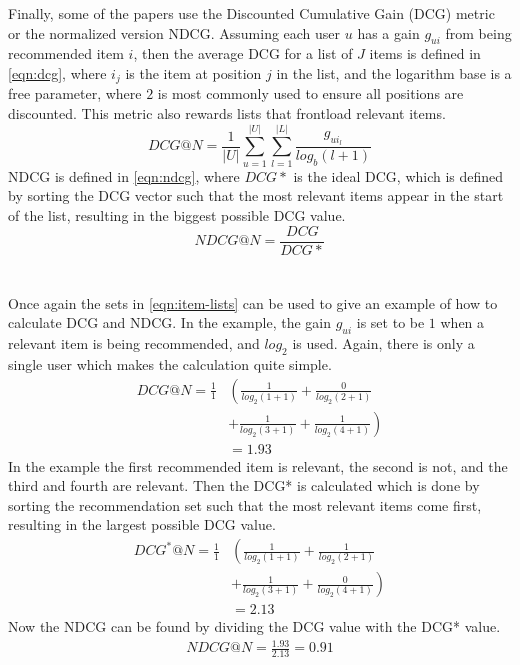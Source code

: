 Finally, some of the papers use the Discounted Cumulative Gain (DCG) metric or the normalized version NDCG.
Assuming each user $u$ has a gain $g_{ui}$ from being recommended item $i$, then the average DCG for a list of $J$ items is defined in \cref{eqn:dcg}, where $i_j$ is the item at position $j$ in the list, and the logarithm base is a free parameter, where $2$ is most commonly used to ensure all positions are discounted.
This metric also rewards lists that frontload relevant items.
\begin{equation}
    \label{eqn:dcg}
    DCG@N = \frac{1}{|U|} \sum\limits_{u=1}^{|U|} \sum\limits_{l = 1}^{|L|} \frac{g_{ui_l}}{log_b (l+1)}
\end{equation}
NDCG is defined in \cref{eqn:ndcg}, where $DCG*$ is the ideal DCG, which is defined by sorting the DCG vector such that the most relevant items appear in the start of the list\cite{dcgpaper}, resulting in the biggest possible DCG value.
\begin{equation}
    \label{eqn:ndcg}
    NDCG@N = \frac{DCG}{DCG*}
\end{equation}
\\\\
Once again the sets in \cref{eqn:item-lists} can be used to give an example of how to calculate DCG and NDCG.
In the example, the gain $g_{ui}$ is set to be $1$ when a relevant item is being recommended, and $log_2$ is used.
Again, there is only a single user which makes the calculation quite simple.
\begin{align*}
    DCG@N = \frac{1}{1} &\left (\frac{1}{log_2 (1+1)} + \frac{0}{log_2 (2+1)} \right.\\
    & \left.+ \frac{1}{log_2 (3+1)} + \frac{1}{log_2 (4+1)}\right) \\
    & = 1.93
\end{align*}
In the example the first recommended item is relevant, the second is not, and the third and fourth are relevant.
Then the DCG* is calculated which is done by sorting the recommendation set such that the most relevant items come first, resulting in the largest possible DCG value.
\begin{align*}
    DCG^*@N = \frac{1}{1} &\left (\frac{1}{log_2 (1+1)} + \frac{1}{log_2 (2+1)} \right.\\
    & \left.+ \frac{1}{log_2 (3+1)} + \frac{0}{log_2 (4+1)}\right) \\
    & = 2.13
\end{align*}
Now the NDCG can be found by dividing the DCG value with the DCG* value.
\begin{align*}
    NDCG@N = \frac{1.93}{2.13} = 0.91
\end{align*}

